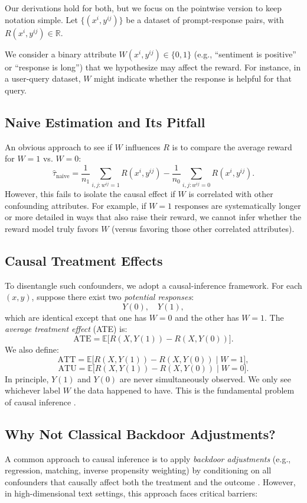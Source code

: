 \documentclass{article}
\theoremstyle{definition}
\newcommand{\E}{\mathbb{E}}
\begin{document}
Our derivations hold for both, but we focus on the pointwise version to keep notation simple. Let $\{(x^i, y^{ij})\}$ be a dataset of prompt-response pairs, with $R(x^i, y^{ij}) \in \mathbb{R}$.

We consider a binary attribute $W(x^i, y^{ij}) \in \{0,1\}$ (e.g., ``sentiment is positive'' or ``response is long'') that we hypothesize may affect the reward. For instance, in a user-query dataset, $W$ might indicate whether the response is helpful for that query.

\subsection{Naive Estimation and Its Pitfall}
An obvious approach to see if $W$ influences $R$ is to compare the average reward for $W=1$ vs. $W=0$:
\[
\hat{\tau}_{\text{naive}} 
= \frac{1}{n_1}\sum_{i,j: w^{ij}=1} R(x^i, y^{ij})
- \frac{1}{n_0}\sum_{i,j: w^{ij}=0} R(x^i, y^{ij}).
\]
However, this fails to isolate the causal effect if $W$ is correlated with other confounding attributes. For example, if $W=1$ responses are systematically longer or more detailed in ways that also raise their reward, we cannot infer whether the reward model truly favors $W$ (versus favoring those other correlated attributes).

\subsection{Causal Treatment Effects}
To disentangle such confounders, we adopt a causal-inference framework. For each $(x, y)$, suppose there exist two \emph{potential responses}:
\[
Y(0), \quad Y(1),
\]
which are identical except that one has $W=0$ and the other has $W=1$. The \emph{average treatment effect} (ATE) is:
\[
\text{ATE} 
= \E\bigl[R(X, Y(1)) - R(X, Y(0))\bigr].
\]
We also define:
\[
\text{ATT} = \E\bigl[R(X, Y(1)) - R(X, Y(0)) \;\big|\; W=1\bigr],
\]
\[
\text{ATU} = \E\bigl[R(X, Y(1)) - R(X, Y(0)) \;\big|\; W=0\bigr].
\]
In principle, $Y(1)$ and $Y(0)$ are never simultaneously observed. We only see whichever label $W$ the data happened to have. This is the fundamental problem of causal inference \cite{imbens2015causal}.

\subsection{Why Not Classical Backdoor Adjustments?}
\label{sec:why_not_backdoor}
A common approach to causal inference is to apply \emph{backdoor adjustments} (e.g., regression, matching, inverse propensity weighting) by conditioning on all confounders that causally affect both the treatment and the outcome \cite{cinelli2024crash}. However, in high-dimensional text settings, this approach faces critical barriers:
\end{document}
